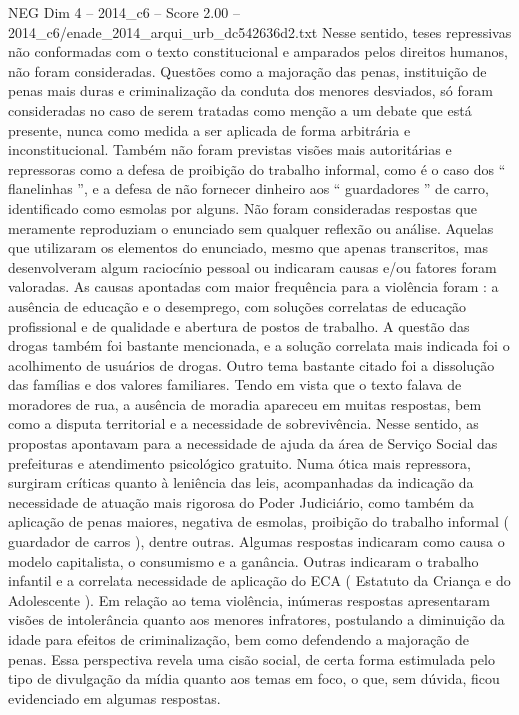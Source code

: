 \begin{textsample}{NEG Dim 4 – 2014\_c6 – Score 2.00 – 2014\_c6/enade\_2014\_arqui\_urb\_dc542636d2.txt}
Nesse sentido, teses repressivas não conformadas com o texto constitucional e amparados pelos direitos humanos, não foram consideradas.
Questões como a majoração das penas, instituição de penas mais duras e criminalização da conduta dos menores desviados, só foram consideradas no caso de serem tratadas como menção a um debate que está presente, nunca como medida a ser aplicada de forma arbitrária e inconstitucional.
Também não foram previstas visões mais autoritárias e repressoras como a defesa de proibição do trabalho informal, como é o caso dos “ flanelinhas ”, e a defesa de não fornecer dinheiro aos “ guardadores ” de carro, identificado como esmolas por alguns.
Não foram consideradas respostas que meramente reproduziam o enunciado sem qualquer reflexão ou análise.
Aquelas que utilizaram os elementos do enunciado, mesmo que apenas transcritos, mas desenvolveram algum raciocínio pessoal ou indicaram causas e/ou fatores foram valoradas.
As causas apontadas com maior frequência para a violência foram : a ausência de educação e o desemprego, com soluções correlatas de educação profissional e de qualidade e abertura de postos de trabalho.
A questão das drogas também foi bastante mencionada, e a solução correlata mais indicada foi o acolhimento de usuários de drogas.
Outro tema bastante citado foi a dissolução das famílias e dos valores familiares.
Tendo em vista que o texto falava de moradores de rua, a ausência de moradia apareceu em muitas respostas, bem como a disputa territorial e a necessidade de sobrevivência.
Nesse sentido, as propostas apontavam para a necessidade de ajuda da área de Serviço Social das prefeituras e atendimento psicológico gratuito.
Numa ótica mais repressora, surgiram críticas quanto à leniência das leis, acompanhadas da indicação da necessidade de atuação mais rigorosa do Poder Judiciário, como também da aplicação de penas maiores, negativa de esmolas, proibição do trabalho informal ( guardador de carros ), dentre outras.
Algumas respostas indicaram como causa o modelo capitalista, o consumismo e a ganância.
Outras indicaram o trabalho infantil e a correlata necessidade de aplicação do ECA ( Estatuto da Criança e do Adolescente ).
Em relação ao tema violência, inúmeras respostas apresentaram visões de intolerância quanto aos menores infratores, postulando a diminuição da idade para efeitos de criminalização, bem como defendendo a majoração de penas.
Essa perspectiva revela uma cisão social, de certa forma estimulada pelo tipo de divulgação da mídia quanto aos temas em foco, o que, sem dúvida, ficou evidenciado em algumas respostas.

\end{textsample}
